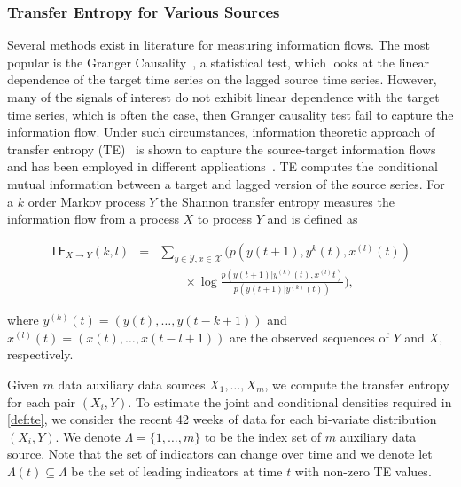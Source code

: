 \documentclass[conference,compsoc]{IEEEtran}
\begin{document}
\subsubsection{Transfer Entropy for Various Sources} \label{subsec:dynamic-TE-src}
Several methods exist in literature for measuring information flows. The most popular is the Granger Causality~\cite{granger1969investigating}, a statistical test, which looks at the linear dependence of the target time series on the lagged source time series. However, many of the signals of interest do not exhibit linear dependence with the target time series, which is often the case, then Granger causality test fail to capture the information flow. Under such circumstances, information theoretic approach of transfer entropy (TE)~\cite{schreiber2000measuring,bossomaier2016transfer} is shown to capture the source-target information flows and has been employed in different applications~\cite{marschinski2002analysing,vicente2011transfer}. 
TE computes the conditional mutual information between a target and lagged version of the source series. For a $k$ order Markov process $Y$  the  Shannon transfer entropy measures the information flow from a process $X$ to process $Y$ and is defined as

{\small
\begin{eqnarray}
    \mathsf{TE}_{X\to Y} (k, l) 
    &= &\sum_{y\in\mathcal{Y},x\in\mathcal{X}} \bigg( p\left(y(t+1),y^{k}(t),x^{(l)}(t) \right) \nonumber \\ 
    & &\qquad \times \log\frac{p(y(t+1)|y^{(k)}(t), x^{(l)} t ) }{p\left(y(t+1)|y^{(k)}(t)\right)}\bigg), \label{def:te}
\end{eqnarray}}

where $y^{(k)}(t) = (y(t), \dots, y(t-k+1))$ and $x^{(l)}(t) = (x(t), \dots, x(t-l+1))$ are the observed sequences of $Y$ and $X$, respectively.

Given $m$ data auxiliary data sources $X_1, \dots, X_m$, we compute the transfer entropy for each pair $(X_i, Y)$. To estimate the joint and conditional densities required in \eqref{def:te}, we consider the recent 42 weeks of data for each bi-variate distribution $(X_i, Y)$. We denote $\Lambda = \{1, \dots, m\}$ to be the index set of $m$ auxiliary data source. Note that the set of indicators can change over time and we denote let $\Lambda(t) \subseteq \Lambda$ be the set of leading indicators at time $t$ with non-zero TE values. 
\end{document}
